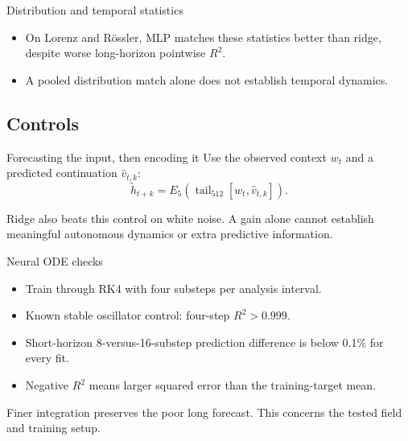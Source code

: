\documentclass[aspectratio=169,11pt]{beamer}
\begin{document}
\begin{frame}{Distribution and temporal statistics}
\begin{table}
\centering\small

\caption{Finite 256-step forecasts from the same 16 starts per validation series. SW: sliced Wasserstein distance in whitened PC8 over the last 128 states. ACF and PSD use PC1--2. Lower is better.}
\end{table}
\begin{itemize}
\item On Lorenz and R\"ossler, MLP matches these statistics better than ridge, despite worse long-horizon pointwise $R^2$.
\item A pooled distribution match alone does not establish temporal dynamics.
\end{itemize}
\end{frame}

\subsection{Controls}
\begin{frame}{Forecasting the input, then encoding it}
Use the observed context $w_t$ and a predicted continuation $\widehat v_{t,k}$:
\[
 \widetilde h_{t+k}=E_5\!\left(\operatorname{tail}_{512}[w_t,\widehat v_{t,k}]\right).
\]
\begin{table}
\centering\small

\caption{Four-step validation $R^2$ on a fixed subset, 32 starts per series. Chronos predicts the input median; Last value repeats the final input. Both re-encode the resulting window. Readouts use exactly the same subset.}
\end{table}
\small
Ridge also beats this control on white noise. A gain alone cannot establish meaningful autonomous dynamics or extra predictive information.
\end{frame}

\begin{frame}{Neural ODE checks}
\begin{itemize}
\item Train through RK4 with four substeps per analysis interval.
\item Known stable oscillator control: four-step $R^2>0.999$.
\item Short-horizon 8-versus-16-substep prediction difference is below 0.1\% for every fit.
\item Negative $R^2$ means larger squared error than the training-target mean.
\end{itemize}
\vspace{3mm}

\vspace{3mm}
Finer integration preserves the poor long forecast. This concerns the tested field and training setup.
\end{frame}
\end{document}
